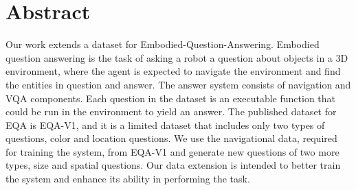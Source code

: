 \documentclass[11pt, a4paper]{article}
\begin{document}
\newpage
\singlespacing
\section*{Abstract}

Our work extends a dataset for Embodied-Question-Answering. Embodied question answering is the task of asking a robot a question about objects in a 3D environment, where the agent is expected to navigate the environment and find the entities in question and answer. The answer system consists of navigation and VQA components.  Each question in the dataset is an executable function that could be run in the environment to yield an answer.  The published dataset for EQA is EQA-V1, and it is a limited dataset that includes only two types of questions, color and location questions. We use the navigational data, required for training the system, from EQA-V1 and generate new questions of two more types, size and spatial questions. Our data extension is intended to better train the system and enhance its ability in performing the task. 

\thispagestyle{empty}

\newpage
\end{document}
